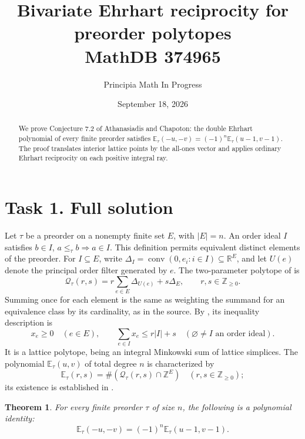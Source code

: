 \documentclass[11pt]{article}
\title{Bivariate Ehrhart reciprocity for preorder polytopes\\\large MathDB 374965}
\author{Principia Math In Progress}
\date{September 18, 2026}
\newtheorem{theorem}{Theorem}
\newcommand{\E}{\mathbb E}
\newcommand{\Q}{\mathcal Q}
\newcommand{\Z}{\mathbb Z}
\begin{document}
\maketitle
\begin{abstract}
We prove Conjecture 7.2 of Athanasiadis and Chapoton: the double
Ehrhart polynomial of every finite preorder satisfies
$\E_\tau(-u,-v)=(-1)^n\E_\tau(u-1,v-1)$.
The proof translates interior lattice points by the all-ones vector
and applies ordinary Ehrhart reciprocity on each positive integral ray.
\end{abstract}

\section*{Task 1. Full solution}
Let $\tau$ be a preorder on a nonempty finite set $E$, with $|E|=n$.
An order ideal $I$ satisfies $b\in I$, $a\le_\tau b\Rightarrow a\in I$.
This definition permits equivalent distinct elements of the preorder.
For $I\subseteq E$, write
$\Delta_I=\operatorname{conv}(0,e_i:i\in I)\subseteq\mathbb R^E$,
and let $U(e)$ denote the principal order filter generated by $e$.
The two-parameter polytope of \cite[Section 3.2]{AC} is
\[
 \Q_\tau(r,s)=r\sum_{e\in E}\Delta_{U(e)}+s\Delta_E,
 \qquad r,s\in\Z_{\ge0}.
\]
Summing once for each element is the same as weighting the summand
for an equivalence class by its cardinality, as in the source.
By \cite[Proposition 3.3]{AC}, its inequality description is
\begin{equation}\label{eq:ineq}
 x_e\ge0\quad(e\in E),\qquad
 \sum_{e\in I}x_e\le r|I|+s
 \quad(\varnothing\ne I\text{ an order ideal}).
\end{equation}
It is a lattice polytope, being an integral Minkowski sum of lattice
simplices. The polynomial $\E_\tau(u,v)$ of total degree $n$ is
characterized by
\[
 \E_\tau(r,s)=\#(\Q_\tau(r,s)\cap\Z^E)
 \quad(r,s\in\Z_{\ge0});
\]
its existence is established in \cite[Proposition 7.1]{AC}.

\begin{theorem}
For every finite preorder $\tau$ of size $n$, the following is a
polynomial identity:
\begin{equation}\label{eq:target}
 \boxed{\E_\tau(-u,-v)=(-1)^n\E_\tau(u-1,v-1).}
\end{equation}
\end{theorem}
\end{document}
